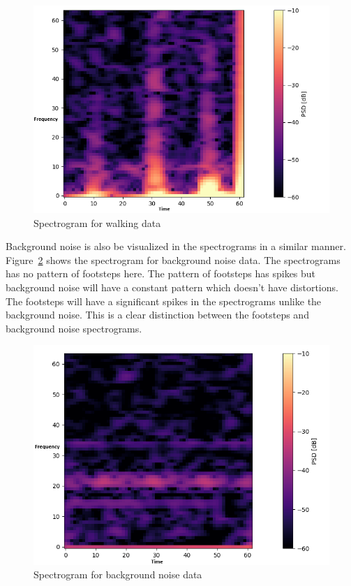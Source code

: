 \begin{figure}[h]
  \centering
  \includegraphics[width=0.7\linewidth]{Bilder/jpg/walking_1d.png}
  \caption{Spectrogram for walking data}
  \label{walking_1d}
\end{figure}

Background noise is also be visualized in the spectrograms in a similar manner. Figure~\ref{bg_1d} shows the spectrogram for background noise data. The spectrograms has no pattern of footsteps here. The pattern of footsteps has spikes but background noise will have a constant pattern which doesn't have distortions. The footsteps will have a significant spikes in the spectrograms unlike the background noise. This is a clear distinction between the footsteps and background noise spectrograms. 

\begin{figure}[h]
  \centering
  \includegraphics[width=0.7\linewidth]{Bilder/jpg/background_1d.png}
  \caption{Spectrogram for background noise data}
  \label{bg_1d}
\end{figure}

